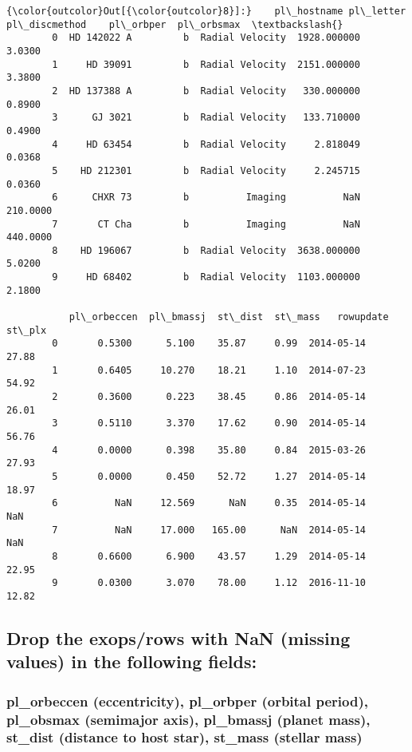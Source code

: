 \documentclass[11pt]{article}
\begin{document}
\begin{Verbatim}[commandchars=\\\{\}]
{\color{outcolor}Out[{\color{outcolor}8}]:}    pl\_hostname pl\_letter    pl\_discmethod    pl\_orbper  pl\_orbsmax  \textbackslash{}
        0  HD 142022 A         b  Radial Velocity  1928.000000      3.0300   
        1     HD 39091         b  Radial Velocity  2151.000000      3.3800   
        2  HD 137388 A         b  Radial Velocity   330.000000      0.8900   
        3      GJ 3021         b  Radial Velocity   133.710000      0.4900   
        4     HD 63454         b  Radial Velocity     2.818049      0.0368   
        5    HD 212301         b  Radial Velocity     2.245715      0.0360   
        6      CHXR 73         b          Imaging          NaN    210.0000   
        7       CT Cha         b          Imaging          NaN    440.0000   
        8    HD 196067         b  Radial Velocity  3638.000000      5.0200   
        9     HD 68402         b  Radial Velocity  1103.000000      2.1800   
        
           pl\_orbeccen  pl\_bmassj  st\_dist  st\_mass   rowupdate  st\_plx  
        0       0.5300      5.100    35.87     0.99  2014-05-14   27.88  
        1       0.6405     10.270    18.21     1.10  2014-07-23   54.92  
        2       0.3600      0.223    38.45     0.86  2014-05-14   26.01  
        3       0.5110      3.370    17.62     0.90  2014-05-14   56.76  
        4       0.0000      0.398    35.80     0.84  2015-03-26   27.93  
        5       0.0000      0.450    52.72     1.27  2014-05-14   18.97  
        6          NaN     12.569      NaN     0.35  2014-05-14     NaN  
        7          NaN     17.000   165.00      NaN  2014-05-14     NaN  
        8       0.6600      6.900    43.57     1.29  2014-05-14   22.95  
        9       0.0300      3.070    78.00     1.12  2016-11-10   12.82  
\end{Verbatim}
            
    \subsection{Drop the exops/rows with NaN (missing values) in the
following
fields:}\label{drop-the-exopsrows-with-nan-missing-values-in-the-following-fields}

\subsubsection{pl\_orbeccen (eccentricity), pl\_orbper (orbital period),
pl\_obsmax (semimajor axis), pl\_bmassj (planet mass), st\_dist
(distance to host star), st\_mass (stellar
mass)}\label{pl_orbeccen-eccentricity-pl_orbper-orbital-period-pl_obsmax-semimajor-axis-pl_bmassj-planet-mass-st_dist-distance-to-host-star-st_mass-stellar-mass}
\end{document}

